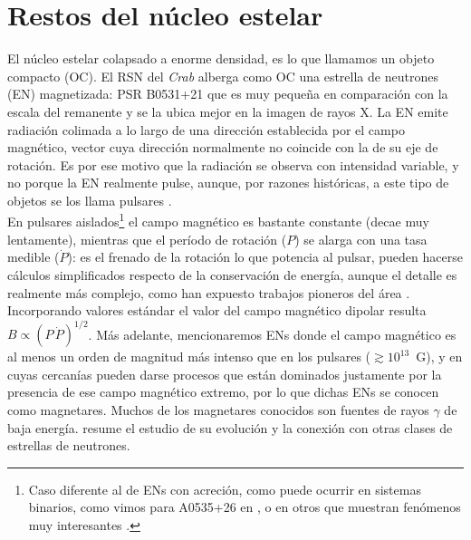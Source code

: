 \documentclass[baaa]{baaa}
\begin{document}
\section{Restos del núcleo estelar}
El núcleo estelar colapsado a enorme densidad, es lo que llamamos un objeto compacto (OC). 
El RSN del {\em Crab} alberga como OC una estrella de neutrones (EN) magnetizada: PSR B0531+21 que es muy pequeña en comparación con la escala del remanente y se la ubica mejor en la imagen de rayos X.
La EN emite radiación colimada a lo largo de una dirección establecida por el campo magnético, vector cuya dirección normalmente no coincide con la de su eje de rotación. Es por ese motivo que la radiación se observa con intensidad variable, y no porque la EN realmente pulse, aunque, por razones históricas, a este tipo de objetos se los llama pulsares \citep{1968-pulsar}.\\

En pulsares aislados\footnote{Caso diferente al de ENs con acreción, como puede ocurrir en sistemas binarios, como vimos para A0535+26 en \cite{2007Orellana}, o en otros que muestran fenómenos muy interesantes \cite{2019Gonzalez}.} el campo magnético es bastante constante (decae muy lentamente), mientras que el período de rotación ($P$) se alarga con una tasa medible ($\dot{P}$): es el frenado de la rotación lo que potencia al pulsar, pueden hacerse cálculos simplificados respecto de la conservación de energía, aunque el detalle es realmente más complejo, como han expuesto trabajos pioneros del área \citep{1969Goldreich}. 
Incorporando valores estándar el valor del campo magnético dipolar resulta $B\propto (P\,\dot{P})^{1/2}$.
Más adelante, mencionaremos ENs donde el campo magnético es al menos un orden de magnitud más intenso que en los pulsares ($\gtrsim 10^{13}$~G), y en cuyas cercanías pueden darse procesos que están dominados justamente por la presencia de ese campo magnético extremo, por lo que dichas ENs se conocen como magnetares. Muchos de los magnetares conocidos son fuentes de rayos $\gamma$ de baja energía. \cite{2018Mereghetti} resume el estudio de su evolución y la conexión con otras clases de estrellas de neutrones.\\
\end{document}
